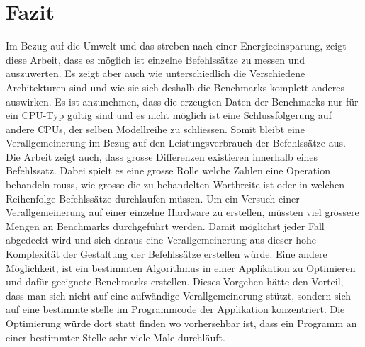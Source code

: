 \chapter{Fazit}

Im Bezug auf die Umwelt und das streben nach einer Energieeinsparung, zeigt diese Arbeit, dass es möglich ist einzelne Befehlssätze zu messen und auszuwerten. Es zeigt aber auch wie unterschiedlich die Verschiedene Architekturen sind und wie sie sich deshalb die Benchmarks komplett anderes auswirken. Es ist anzunehmen, dass die erzeugten Daten der Benchmarks nur für ein CPU-Typ gültig sind und es nicht möglich ist eine Schlussfolgerung auf andere CPUs, der selben Modellreihe zu schliessen. Somit bleibt eine Verallgemeinerung im Bezug auf den Leistungsverbrauch der Befehlssätze aus. Die Arbeit zeigt auch, dass grosse Differenzen existieren innerhalb eines Befehlssatz. Dabei spielt es eine grosse Rolle welche Zahlen eine Operation behandeln muss, wie grosse die zu behandelten Wortbreite ist oder in welchen Reihenfolge Befehlssätze durchlaufen müssen. Um ein Versuch einer Verallgemeinerung auf einer einzelne Hardware zu erstellen, müssten viel grössere Mengen an Benchmarks durchgeführt werden. Damit möglichst jeder Fall abgedeckt wird und sich daraus eine Verallgemeinerung aus dieser hohe Komplexität der Gestaltung der Befehlssätze erstellen würde. Eine andere Möglichkeit, ist ein bestimmten Algorithmus in einer Applikation zu Optimieren und dafür geeignete Benchmarks erstellen. Dieses Vorgehen hätte den Vorteil, dass man sich nicht auf eine aufwändige Verallgemeinerung stützt, sondern sich auf eine bestimmte stelle im Programmcode der Applikation konzentriert. Die Optimierung würde dort statt finden wo vorhersehbar ist, dass ein Programm an einer bestimmter Stelle sehr viele Male durchläuft.
\par

